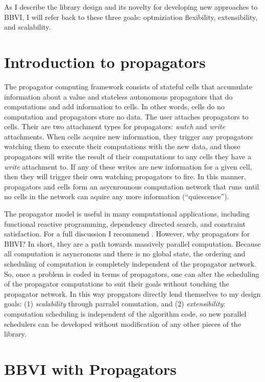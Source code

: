 \documentclass[12pt]{article}
\begin{document}
As I describe the library design and its novelty for developing new
approaches to BBVI, I will refer back to these three goals:
optmiziation flexibility, extensibility, and scalability.

\section{Introduction to propagators}

The propagator computing framework \citep{radul-2009} consists of
stateful cells that accumulate information about a value and stateless
autonomous propagators that do computations and add information to
cells. In other words, cells do no computation and propagators store
no data. The user attaches propagators to cells. Their are two
attachment types for propagators: \textit{watch} and \textit{write}
attachments. When cells acquire new information, they trigger any
propagators watching them to execute their computations with the new
data, and those propagators will write the result of their
computations to any cells they have a \textit{write} attachment to. If any
of these writes are new information for a given cell, then they will
trigger their own watching propagators to fire. In this manner,
propagators and cells form an asycnrounous computation network that
runs until no cells in the network can aquire any more information
(``quiescence'').

The propagator model is useful in many computational applications,
including functional reactive programming, dependency directed search,
and constraint satisfaction. For a full discussion I recommend
\citet{radul-2009}. However, why propagators for BBVI? In short, they
are a path towards massively parallel computation. Because all
computation is asyncronous and there is no global state, the ordering
and scheduling of computation is completely independent of the
propagator network. So, once a problem is coded in terms of
propagators, one can alter the scheduling of the propagator
computations to suit their goals without touching the propagator
network. In this way propgators directly lend themselves to my design
goals: (1) \textit{scalability} through parralel comutation,
and (2) \textit{extensibility}: computation scheduling is independent
of the algorithm code, so new parallel schedulers can be developed
without modification of any other pieces of the library.

\section{BBVI with Propagators}
\end{document}
